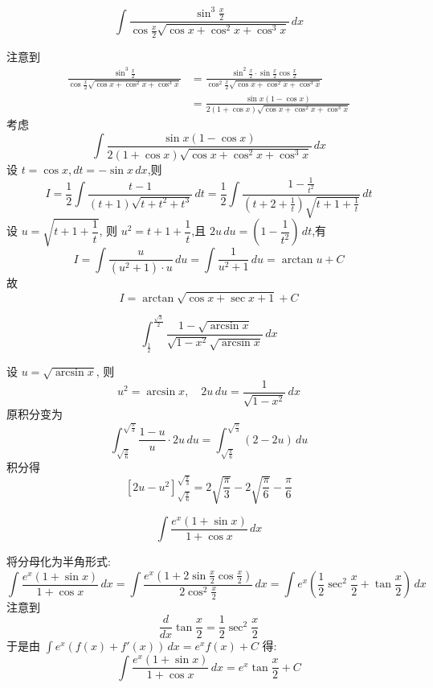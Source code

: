 \begin{questions}
    \question
    \[ 
    \int \frac{\sin^3 \frac{x}{2}}{\cos \frac{x}{2} \sqrt{\cos x + \cos^2 x + \cos^3 x}} \,dx 
    \]
    \begin{solution}
        注意到
        \begin{align*}
        \frac{\sin^3 \frac{x}{2}}{\cos \frac{x}{2} \sqrt{\cos x + \cos^2 x + \cos^3 x}} 
        &= \frac{\sin^2 \frac{x}{2} \cdot \sin \frac{x}{2}\cos \frac{x}{2}}{\cos^2 \frac{x}{2} \sqrt{\cos x + \cos^2 x + \cos^3 x}}\\
        &=\frac{\sin x (1 - \cos x)}{2(1 + \cos x) \sqrt{\cos x + \cos^2 x + \cos^3 x}}
        \end{align*}
        考虑
        \[ 
        \int \frac{\sin x (1 - \cos x)}{2(1 + \cos x) \sqrt{\cos x + \cos^2 x + \cos^3 x}} \,dx 
        \]
        设 $t = \cos x, dt = -\sin x \,dx$,则
        \[ 
        I = \frac{1}{2} \int \frac{t - 1}{(t+1) \sqrt{t + t^2 + t^3}} \,dt = \frac{1}{2} \int \frac{1 - \frac{1}{t^2}}{(t + 2 + \frac{1}{t}) \sqrt{t + 1 + \frac{1}{t}}} \,dt 
        \]
        设 $u = \sqrt{t + 1 + \dfrac{1}{t}}$, 则 $u^2 = t + 1 + \dfrac{1}{t}$,且 $2u \,du = (1 - \dfrac{1}{t^2}) \,dt$,有
        \[ 
        I = \int \frac{u}{ (u^2 + 1) \cdot u } \,du = \int \frac{1}{u^2 + 1} \,du = \arctan u + C
        \]
        故
        \[ 
        I = \arctan \sqrt{\cos x + \sec x + 1} + C 
        \]
    \end{solution}

    \question 
    \[
    \int_{\frac{1}{2}}^{\frac{\sqrt{3}}{2}} \frac{1 - \sqrt{\arcsin x}}{\sqrt{1-x^2}\sqrt{\arcsin x}} \, dx
    \]
    \begin{solution}
        设 $u = \sqrt{\arcsin x}$, 则 
        \[
        u^2 = \arcsin x,\quad 2u \,du = \frac{1}{\sqrt{1-x^2}} \,dx
        \]
        原积分变为
        \[
        \int_{\sqrt{\frac{\pi}{6}}}^{\sqrt{\frac{\pi}{3}}} \frac{1 - u}{u} \cdot 2u \, du = \int_{\sqrt{\frac{\pi}{6}}}^{\sqrt{\frac{\pi}{3}}} (2 - 2u) \, du
        \]
        积分得
        \[
        \left[ 2u - u^2 \right]_{\sqrt{\frac{\pi}{6}}}^{\sqrt{\frac{\pi}{3}}} = 2\sqrt{\frac{\pi}{3}} - 2\sqrt{\frac{\pi}{6}} - \frac{\pi}{6}
        \]
    \end{solution}

    \question
    \[
    \int \frac{e^x(1+\sin x)}{1+\cos x} \,dx
    \]
    \begin{solution}
        将分母化为半角形式:
        \[
        \int \frac{e^x(1+\sin x)}{1+\cos x} \,dx 
        = \int \frac{e^x (1 + 2\sin\frac{x}{2}\cos\frac{x}{2})}{2\cos^2\frac{x}{2}} \,dx
        = \int e^x \left( \frac{1}{2}\sec^2\frac{x}{2} + \tan\frac{x}{2} \right) \,dx
        \]
        注意到 
        \[
        \frac{d}{dx}\tan\frac{x}{2} = \frac{1}{2}\sec^2\frac{x}{2}
        \]
        于是由 $\displaystyle \int e^x (f(x)+f'(x)) \,dx = e^x f(x) + C$ 得:
        \[
        \int \frac{e^x(1+\sin x)}{1+\cos x} \,dx = e^x \tan\frac{x}{2} + C
        \]
    \end{solution}


\end{questions}
